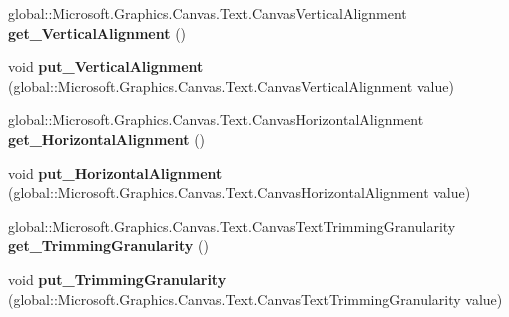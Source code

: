 \begin{DoxyCompactItemize}
global\+::\+Microsoft.\+Graphics.\+Canvas.\+Text.\+Canvas\+Vertical\+Alignment {\bfseries get\+\_\+\+Vertical\+Alignment} ()
\item 
\mbox{\label{interface_microsoft_1_1_graphics_1_1_canvas_1_1_text_1_1_i_canvas_text_format_a47eeac343ee56e937ea663d034a43e3f}} 
void {\bfseries put\+\_\+\+Vertical\+Alignment} (global\+::\+Microsoft.\+Graphics.\+Canvas.\+Text.\+Canvas\+Vertical\+Alignment value)
\item 
\mbox{\label{interface_microsoft_1_1_graphics_1_1_canvas_1_1_text_1_1_i_canvas_text_format_a8b95906a63861d6e560977db8b154cb6}} 
global\+::\+Microsoft.\+Graphics.\+Canvas.\+Text.\+Canvas\+Horizontal\+Alignment {\bfseries get\+\_\+\+Horizontal\+Alignment} ()
\item 
\mbox{\label{interface_microsoft_1_1_graphics_1_1_canvas_1_1_text_1_1_i_canvas_text_format_aa35da0e8e55810f44b20d72a857dc479}} 
void {\bfseries put\+\_\+\+Horizontal\+Alignment} (global\+::\+Microsoft.\+Graphics.\+Canvas.\+Text.\+Canvas\+Horizontal\+Alignment value)
\item 
\mbox{\label{interface_microsoft_1_1_graphics_1_1_canvas_1_1_text_1_1_i_canvas_text_format_a2db054de408def815030a08cc7d260fb}} 
global\+::\+Microsoft.\+Graphics.\+Canvas.\+Text.\+Canvas\+Text\+Trimming\+Granularity {\bfseries get\+\_\+\+Trimming\+Granularity} ()
\item 
\mbox{\label{interface_microsoft_1_1_graphics_1_1_canvas_1_1_text_1_1_i_canvas_text_format_a8024f0e16f1e45d41135c2f6848b2dca}} 
void {\bfseries put\+\_\+\+Trimming\+Granularity} (global\+::\+Microsoft.\+Graphics.\+Canvas.\+Text.\+Canvas\+Text\+Trimming\+Granularity value)
\item 
\mbox{\label{interface_microsoft_1_1_graphics_1_1_canvas_1_1_text_1_1_i_canvas_text_format_a465c8b167bfb7c8dd79219d09f74a2ab}} 

\end{DoxyCompactItemize}

